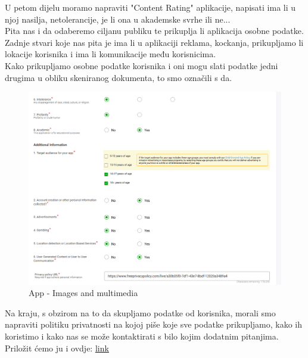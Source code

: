  U petom dijelu moramo napraviti "Content Rating" aplikacije, napisati ima li u njoj nasilja, netolerancije, je li ona u akademske svrhe ili ne...\\ Pita nas i da odaberemo ciljanu publiku te prikuplja li aplikacija osobne podatke. Zadnje stvari koje nas pita je ima li u aplikaciji reklama, kockanja, prikupljamo li lokacije korisnika i ima li komunikacije među korisnicima.\\
  Kako prikupljamo osobne podatke korisnika i oni mogu slati podatke jedni\\ drugima u obliku skeniranog dokumenta, to smo označili s da.
  	 \begin{figure}[H]
  	\centering
  	\includegraphics[scale=0.55]{./slike/amzn5.png}
  	\caption{App - Images and multimedia}
  	\label{fig:amzn5}
  \end{figure} 
  Na kraju, s obzirom na to da skupljamo podatke od korisnika, morali smo napraviti politiku privatnosti na kojoj piše koje sve podatke prikupljamo, kako ih koristimo i kako nas se može kontaktirati s bilo kojim dodatnim pitanjima.
  Priložit ćemo ju i ovdje:
  \href{https://www.freeprivacypolicy.com/live/a30b05f0-7df1-43e7-8bdf-12020a3489a4}{\underline{link}}\eject
  	
